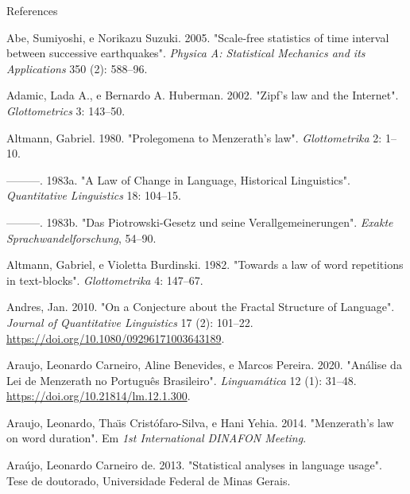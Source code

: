 \documentclass[
  ignorenonframetext,
  aspectratio=169]{beamer}
\newlength{\cslhangindent}
\newlength{\cslentryspacingunit} %
\newenvironment{CSLReferences}[2] %
 {%
  \setlength{\parindent}{0pt}
  \ifodd #1
  \let\oldpar\par
  \def\par{\hangindent=\cslhangindent\oldpar}
  \fi
  \setlength{\parskip}{#2\cslentryspacingunit}
 }%
 {}
\begin{document}
\begin{frame}[allowframebreaks]{References}
\hypertarget{refs}{}
\begin{CSLReferences}{1}{0}
\leavevmode{}%
Abe, Sumiyoshi, e Norikazu Suzuki. 2005. {"Scale-free statistics of time
interval between successive earthquakes"}. \emph{Physica A: Statistical
Mechanics and its Applications} 350 (2): 588--96.

\leavevmode{}%
Adamic, Lada A., e Bernardo A. Huberman. 2002. {"Zipf's law and the
Internet"}. \emph{Glottometrics} 3: 143--50.

\leavevmode{}%
Altmann, Gabriel. 1980. {"Prolegomena to {M}enzerath's law"}.
\emph{Glottometrika} 2: 1--10.

\leavevmode{}%
---------. 1983a. {"A Law of Change in Language, Historical
Linguistics"}. \emph{Quantitative Linguistics} 18: 104--15.

\leavevmode{}%
---------. 1983b. {"Das Piotrowski-Gesetz und seine
Verallgemeinerungen"}. \emph{Exakte Sprachwandelforschung}, 54--90.

\leavevmode{}%
Altmann, Gabriel, e Violetta Burdinski. 1982. {"Towards a law of word
repetitions in text-blocks"}. \emph{Glottometrika} 4: 147--67.

\leavevmode{}%
Andres, Jan. 2010. {"On a Conjecture about the Fractal Structure of
Language"}. \emph{Journal of Quantitative Linguistics} 17 (2): 101--22.
\url{https://doi.org/10.1080/09296171003643189}.

\leavevmode{}%
Araujo, Leonardo Carneiro, Aline Benevides, e Marcos Pereira. 2020.
{"An{á}lise da Lei de Menzerath no Portugu{ê}s Brasileiro"}.
\emph{Linguam{á}tica} 12 (1): 31--48.
\url{https://doi.org/10.21814/lm.12.1.300}.

\leavevmode{}%
Araujo, Leonardo, Thaı̈s Cristófaro-Silva, e Hani Yehia. 2014.
{"Menzerath's law on word duration"}. Em \emph{1st International DINAFON
Meeting}.

\leavevmode{}%
Araújo, Leonardo Carneiro de. 2013. {"Statistical analyses in language
usage"}. Tese de doutorado, Universidade Federal de Minas Gerais.


\end{CSLReferences}
\end{frame}
\end{document}
